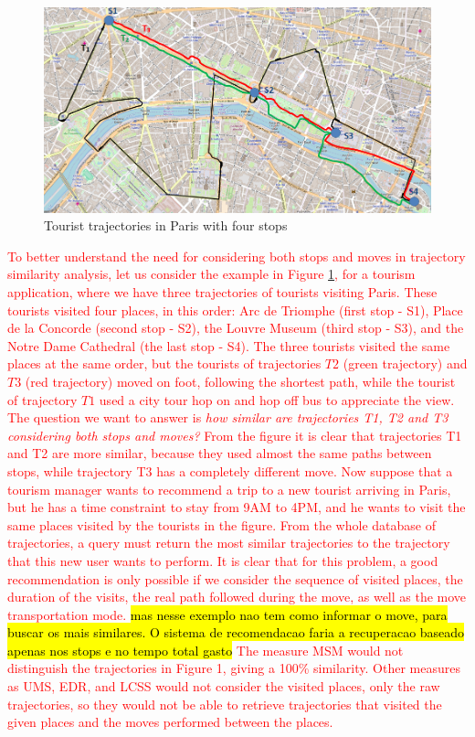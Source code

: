 \documentclass[12pt]{article}
\begin{document}
\begin{figure}[h]
\label{fig:Paris}
\centering
\includegraphics[width=1.0\textwidth]{Images/paris4.png}
\caption{Tourist trajectories in Paris with four stops}
\end{figure}


\textcolor{red}{To better understand the need for considering both stops and moves in trajectory similarity analysis, let us consider the example in Figure \ref{fig:Paris}, for a tourism application, where we have three trajectories of tourists visiting Paris. These tourists visited four places, in this order:  Arc de Triomphe (first stop - S1), Place de la Concorde (second stop - S2), the Louvre Museum (third stop - S3), and the Notre Dame Cathedral (the last stop - S4). The three tourists visited the same places at the same order, but the tourists of trajectories $T2$ (green trajectory) and $T3$ (red trajectory) moved on foot, following the shortest path, while the tourist of trajectory $T1$ used a city tour hop on and hop off bus to appreciate the view. The question we want to answer is \emph{how similar are trajectories T1, T2 and T3 considering both stops and moves?} From the figure it is clear that trajectories T1 and T2 are more similar, because they used almost the same paths between stops, while trajectory T3 has a completely different move. Now suppose that a tourism manager wants to recommend a trip to a new tourist arriving in Paris, but he has a time constraint to stay from 9AM to 4PM, and he wants to visit the same places visited by the tourists in the figure. From the whole database of trajectories, a query must return the most similar trajectories to the trajectory that this new user wants to perform. It is clear that for this problem, a good recommendation is only possible if we consider the sequence of visited places, the duration of the visits, the real path followed during the move, as well as the move transportation mode. \hl{ mas nesse exemplo nao tem como informar o move, para buscar os mais similares. O sistema de  recomendacao faria a recuperacao  baseado apenas nos stops e no tempo total gasto} The measure MSM would not distinguish the trajectories in Figure 1, giving a 100\% similarity. Other measures as UMS, EDR, and LCSS would not consider the visited places, only the raw trajectories, so they would not be able to retrieve trajectories that visited the given places and the moves performed between the places.
}
\end{document}

